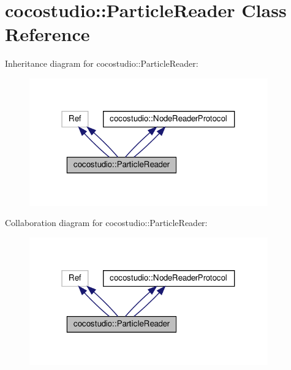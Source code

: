 \hypertarget{classcocostudio_1_1ParticleReader}{}\section{cocostudio\+:\+:Particle\+Reader Class Reference}
\label{classcocostudio_1_1ParticleReader}


Inheritance diagram for cocostudio\+:\+:Particle\+Reader\+:
\nopagebreak
\begin{figure}[H]
\begin{center}
\leavevmode
\includegraphics[width=292pt]{classcocostudio_1_1ParticleReader__inherit__graph}
\end{center}
\end{figure}


Collaboration diagram for cocostudio\+:\+:Particle\+Reader\+:
\nopagebreak
\begin{figure}[H]
\begin{center}
\leavevmode
\includegraphics[width=292pt]{classcocostudio_1_1ParticleReader__coll__graph}
\end{center}
\end{figure}
